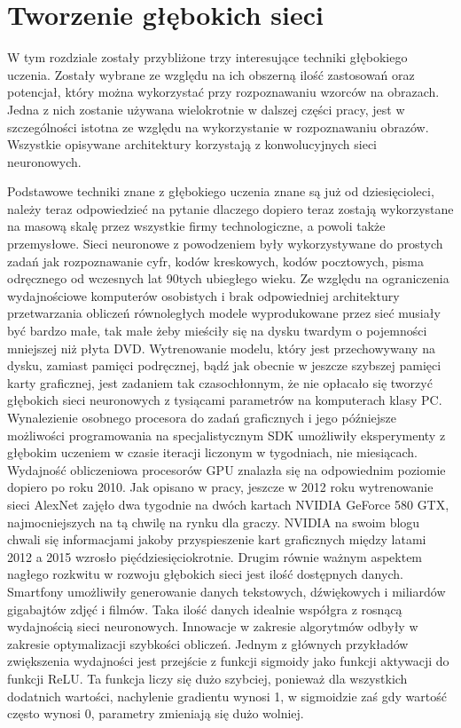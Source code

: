 \documentclass[12pt,a4paper,twoside,titlepage,openright]{book}
\begin{document}
\section{Tworzenie głębokich sieci}
W tym rozdziale zostały przybliżone trzy interesujące techniki głębokiego uczenia. Zostały wybrane ze względu na ich obszerną ilość zastosowań oraz potencjał, który można wykorzystać przy rozpoznawaniu wzorców na obrazach. Jedna z nich zostanie używana wielokrotnie w dalszej części pracy, jest w szczególności istotna ze względu na wykorzystanie w rozpoznawaniu obrazów. Wszystkie opisywane architektury korzystają z konwolucyjnych sieci neuronowych.

Podstawowe techniki znane z głębokiego uczenia znane są już od dziesięcioleci, należy teraz odpowiedzieć na pytanie dlaczego dopiero teraz zostają wykorzystane na masową skalę przez wszystkie firmy technologiczne, a powoli także przemysłowe. Sieci neuronowe z powodzeniem były wykorzystywane do prostych zadań jak rozpoznawanie cyfr, kodów kreskowych, kodów pocztowych, pisma odręcznego od wczesnych lat 90tych ubiegłego wieku. Ze względu na ograniczenia wydajnościowe komputerów osobistych i brak odpowiedniej architektury przetwarzania obliczeń równoległych modele wyprodukowane przez sieć musiały być bardzo małe, tak małe żeby mieściły się na dysku twardym o pojemności mniejszej niż płyta DVD. Wytrenowanie modelu, który jest przechowywany na dysku, zamiast pamięci podręcznej, bądź jak obecnie w jeszcze szybszej pamięci karty graficznej, jest zadaniem tak czasochłonnym, że nie opłacało się tworzyć głębokich sieci neuronowych z tysiącami parametrów na komputerach klasy PC. Wynalezienie osobnego procesora do zadań graficznych i jego późniejsze możliwości programowania na specjalistycznym SDK umożliwiły eksperymenty z głębokim uczeniem w czasie iteracji liczonym w tygodniach, nie miesiącach. Wydajność obliczeniowa procesorów GPU znalazła się na odpowiednim poziomie dopiero po roku 2010. Jak opisano w pracy, jeszcze w 2012 roku wytrenowanie sieci AlexNet zajęło dwa tygodnie na dwóch kartach NVIDIA GeForce 580 GTX, najmocniejszych na tą chwilę na rynku dla graczy. NVIDIA na swoim blogu chwali się informacjami jakoby przyspieszenie kart graficznych między latami 2012 a 2015 wzrosło pięćdziesięciokrotnie. \cite{siteNvidiaAcceleration} Drugim równie ważnym aspektem nagłego rozkwitu w rozwoju głębokich sieci jest ilość dostępnych danych. Smartfony umożliwiły generowanie danych tekstowych, dźwiękowych i miliardów gigabajtów zdjęć i filmów. Taka ilość danych idealnie współgra z rosnącą wydajnością sieci neuronowych. Innowacje w zakresie algorytmów odbyły w zakresie optymalizacji szybkości obliczeń. Jednym z głównych przykładów zwiększenia wydajności jest przejście z funkcji sigmoidy jako funkcji aktywacji do funkcji ReLU. Ta funkcja liczy się dużo szybciej, ponieważ dla wszystkich dodatnich wartości, nachylenie gradientu wynosi 1, w sigmoidzie zaś gdy wartość często wynosi 0, parametry zmieniają się dużo wolniej.
\end{document}
